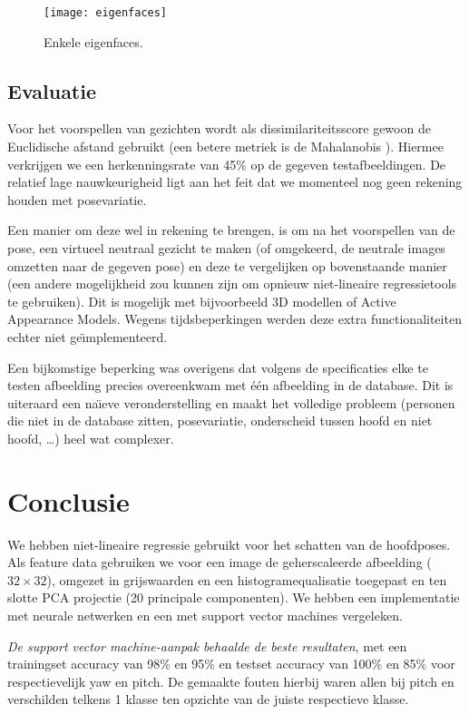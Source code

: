 \documentclass[a4paper,dutch,11pt]{scrartcl}
\begin{document}
\begin{figure}[hbpt]
\centering
 \texttt{[image: eigenfaces]}
 \caption{Enkele eigenfaces.}
\label{fig:eigenfaces}
\end{figure}

\subsection{Evaluatie}
Voor het voorspellen van gezichten wordt als dissimilariteitsscore gewoon de Euclidische afstand gebruikt (een betere metriek is de Mahalanobis \cite{stat}). Hiermee verkrijgen we een herkenningsrate van 45\% op de gegeven testafbeeldingen. De relatief lage nauwkeurigheid ligt aan het feit dat we momenteel nog geen rekening houden met posevariatie.

Een manier om deze wel in rekening te brengen, is om na het voorspellen van de pose, een virtueel neutraal gezicht te maken (of omgekeerd, de neutrale images omzetten naar de gegeven pose) en deze te vergelijken op bovenstaande manier (een andere mogelijkheid zou kunnen zijn om opnieuw niet-lineaire regressietools te gebruiken). Dit is mogelijk met bijvoorbeeld 3D modellen of Active Appearance Models. Wegens tijdsbeperkingen werden deze extra functionaliteiten echter niet ge\"{\i}mplementeerd. 

Een bijkomstige beperking was overigens dat volgens de specificaties elke te testen afbeelding precies overeenkwam met \'e\'en afbeelding in de database. Dit is uiteraard een na\"{\i}eve veronderstelling en maakt het volledige probleem (personen die niet in de database zitten, posevariatie, onderscheid tussen hoofd en niet hoofd, \ldots{}) heel wat complexer.


\section{Conclusie}
We hebben niet-lineaire regressie gebruikt voor het schatten van de hoofdposes. Als feature data gebruiken we voor een image de geherscaleerde afbeelding ($32 \times 32$), omgezet in grijswaarden en een histogramequalisatie toegepast en ten slotte PCA projectie (20 principale componenten). We hebben een implementatie met neurale netwerken en een met support vector machines vergeleken.

\emph{De support vector machine-aanpak behaalde de beste resultaten}, met een trainingset accuracy van 98\% en 95\% en testset accuracy van 100\% en 85\% voor respectievelijk yaw en pitch.
De gemaakte fouten hierbij waren allen bij pitch en verschilden telkens 1 klasse ten opzichte van de juiste respectieve klasse.
\end{document}
